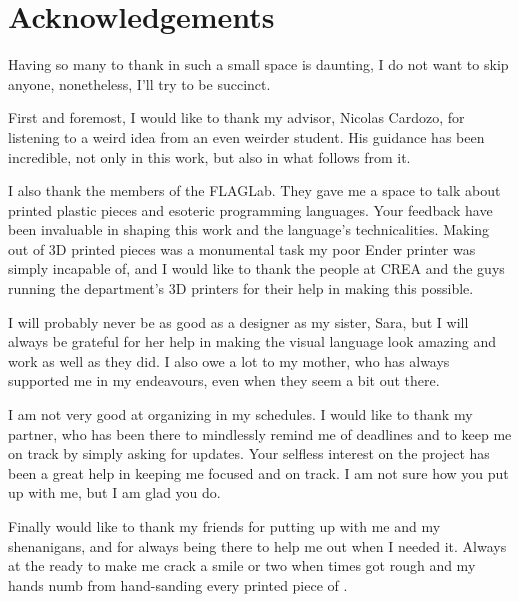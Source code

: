 
\chapter{Acknowledgements}

Having so many to thank in such a small space is daunting, I do not want to skip anyone, nonetheless, I'll try to be succinct.

First and foremost, I would like to thank my advisor, Nicolas Cardozo, for listening to a weird idea from an even weirder student.
His guidance has been incredible, not only in this work, but also in what follows from it.

I also thank the members of the FLAGLab. They gave me a space to talk about printed plastic pieces and esoteric programming languages. Your feedback have been invaluable in shaping this work and the language's technicalities.
Making \sculpt out of 3D printed pieces was a monumental task my poor Ender printer was simply incapable of, and I would like to thank the people at CREA and the guys running the department's 3D printers for their help in making this possible.

I will probably never be as good as a designer as my sister, Sara, but I will always be grateful for
her help in making the \sculpt visual language look amazing and work as well as they did.
I also owe a lot to my mother, who has always supported me in my endeavours, even when they seem a bit out there.

I am not very good at organizing in my schedules. I would like to thank my partner, who has been there to mindlessly remind me of deadlines and to keep me on track by simply asking for updates.
Your selfless interest on the project has been a great help in keeping me focused and on track. I am not sure how you put up with me, but I am glad you do.

Finally would like to thank my friends for putting up with me and my shenanigans, and for always being there to help me out when I needed it.
Always at the ready to make me crack a smile or two when times got rough and my hands numb from hand-sanding every printed piece of \sculpt.
\endinput

